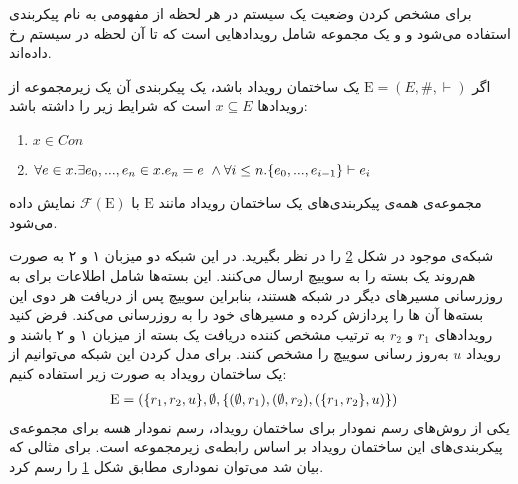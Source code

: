 برای مشخص کردن وضعیت یک سیستم در هر لحظه از مفهومی به نام پیکر‌بندی
استفاده می‌شود و
و یک مجموعه شامل رویدادهایی است که تا آن لحظه در سیستم رخ داده‌اند.
\begin{definition}
    اگر
    $\mathrm{E} = (E,\#,\vdash)$
    یک ساختمان رویداد باشد، یک پیکربندی آن یک زیرمجموعه از رویداد‌ها
    $x \subseteq E$
    است که شرایط زیر را داشته باشد:
    \begin{enumerate}
        \item $x \in Con$
        \item $\forall e \in x. \exists e_0,...,e_n \in x. e_n = e \ \wedge
                  \forall i \leq n. \{e_0,...,e_{i-1}\} \vdash e_i$
    \end{enumerate}
\end{definition}
مجموعه‌ی همه‌ی پیکربندی‌های یک ساختمان رویداد مانند
$\mathrm{E}$
با
$\mathcal{F}(\mathrm{E})$
نمایش داده می‌شود.

شبکه‌ی موجود در شکل
\ref{fig:es:update}
را در نظر بگیرید.
در این شبکه دو میزبان ۱ و ۲ به صورت هم‌روند یک بسته را به سوییچ ارسال می‌کنند.
این بسته‌ها شامل اطلاعات برای به روزرسانی مسیر‌های دیگر در شبکه هستند، بنابراین سوییچ پس از دریافت هر دوی این بسته‌ها آن ها را پردازش کرده و مسیر‌های خود را به روزرسانی می‌کند.
فرض کنید رویدادهای 
$r_1$
و
$r_2$
به ترتیب مشخص کننده‌ دریافت یک بسته از میزبان ۱ و ۲ باشند و 
رویداد 
$u$
به‌روز رسانی سوییچ را مشخص کنند.
برای مدل کردن این شبکه می‌توانیم از یک ساختمان رویداد به صورت زیر استفاده کنیم:
\begin{align*}
    \mathrm{E} & = (
    \{r_1,r_2,u\},
    \emptyset, \{(\emptyset,r_1),(\emptyset,r_2),(\{r_1,r_2\},u)\}
    )
\end{align*}
یکی از روش‌های رسم نمودار برای ساختمان رویداد، رسم نمودار هسه
برای مجموعه‌ی پیکربندی‌های این ساختمان رویداد بر اساس رابطه‌ی زیرمجموعه است.
برای مثالی که بیان شد می‌توان نموداری مطابق شکل
\ref{fig:es:configs}
را رسم کرد.
\begin{figure}
    \centering
    \caption{}
    \label{fig:es:configs}
\end{figure}

\begin{figure}
    \centering
    \caption{}
    \label{fig:es:update}
\end{figure}